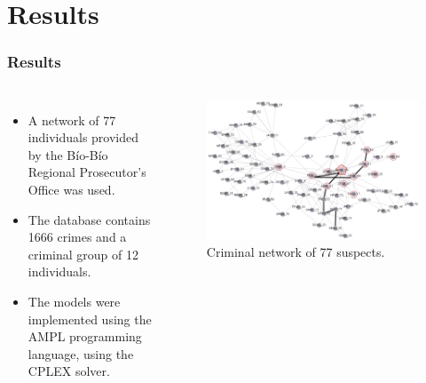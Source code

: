 \documentclass[aspectratio=169]{beamer}
\begin{document}
\section{Results}
\begin{frame}
\frametitle{Results}
\begin{columns}
    \begin{itemize}
      \item A network of 77 individuals provided by the Bío-Bío Regional Prosecutor's Office was used. 
      \item The database contains 1666 crimes and a criminal group of 12 individuals.
      \item The models were implemented using the AMPL programming language, using the CPLEX solver.
    \end{itemize}
    \begin{figure}[ht]
      \centering
      \includegraphics[width=\textwidth]{images/network-stram.pdf}
      \caption{\footnotesize Criminal network of 77 suspects.}
    \end{figure}
  \end{columns}
\end{frame}
\end{document}
